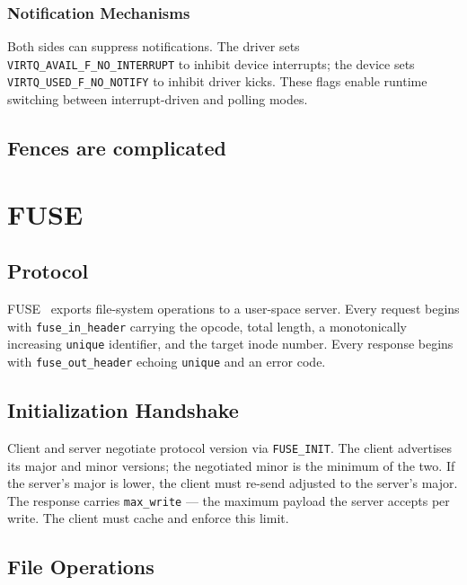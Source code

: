 \documentclass[12pt, a4paper, oneside]{report}
\begin{document}
\subsubsection{Notification Mechanisms}

Both sides can suppress notifications.  The driver sets
\texttt{VIRTQ\_AVAIL\_F\_NO\_INTERRUPT} to inhibit device interrupts; the device
sets \texttt{VIRTQ\_USED\_F\_NO\_NOTIFY} to inhibit driver kicks.  These flags
enable runtime switching between interrupt-driven and polling modes.

\subsection{Fences are complicated}

\section{FUSE}
\label{sec:fuse}

\subsection{Protocol}

FUSE~\cite{fuse2024} exports file-system operations to a user-space server.
Every request begins with \texttt{fuse\_in\_header} carrying the opcode, total
length, a monotonically increasing \texttt{unique} identifier, and the target
inode number.  Every response begins with \texttt{fuse\_out\_header} echoing
\texttt{unique} and an error code.

\subsection{Initialization Handshake}

Client and server negotiate protocol version via \texttt{FUSE\_INIT}.  The
client advertises its major and minor versions; the negotiated minor is the
minimum of the two.  If the server's major is lower, the client must re-send
adjusted to the server's major.  The response carries \texttt{max\_write} ---
the maximum payload the server accepts per write.  The client must cache and
enforce this limit.

\subsection{File Operations}
\end{document}
